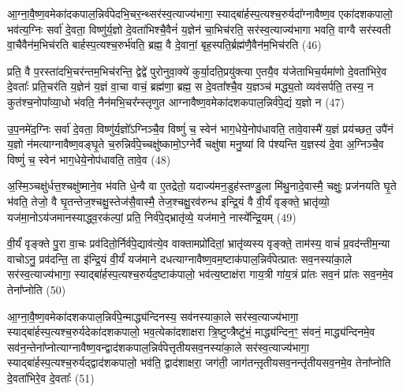 {\anuvakamend[{अपि॒ तꣴ स्यु॑र्वैन्ध भवति॒ चतु॑र्दश च॥७॥}]}

आ॒ग्ना॒वै॒ष्ण॒वमेका॑दकपाल॒न्निर्व॑पेदभि॒चर॒न्थ्सर॑स्व॒त्याज्य॑भागा॒ स्याद्बा॑र्\mbox{}हस्प॒त्यश्च॒रुर्यदा᳚ग्नावैष्ण॒व एका॑दशकपालो॒ भव॑त्य॒ग्निः सर्वा॑ दे॒वता॒ विष्णु॑र्य॒ज्ञो दे॒वता॑भिश्चै॒वैनं॑ य॒ज्ञेन॑ चा॒भिच॑रति॒ सर॑स्व॒त्याज्य॑भागा भवति॒ वाग्वै सर॑स्वती वा॒चैवैन॑म॒भिच॑रति बार्\mbox{}हस्प॒त्यश्च॒रुर्भ॑वति॒ ब्रह्म॒ वै दे॒वानां॒ बृह॒स्पति॒र्ब्रह्म॑णै॒वैन॑म॒भिच॑रति (46)

प्रति॒ वै प॒रस्ता॑दभि॒चर॑न्तम॒भिच॑रन्ति॒ द्वेद्वे॑ पुरोनुवा॒क्ये॑ कुर्या॒दति॒प्रयु॑क्त्या ए॒तयै॒व य॑जेताभिच॒र्यमा॑णो दे॒वता॑भिरे॒व दे॒वताः᳚ प्रति॒चर॑ति य॒ज्ञेन॑ य॒ज्ञं वा॒चा वाचं॒ ब्रह्म॑णा॒ ब्रह्म॒ स दे॒वता᳚श्चै॒व य॒ज्ञञ्च॑ मद्ध्य॒तो व्यव॑सर्पति॒ तस्य॒ न कुत॑श्च॒नोपा᳚व्या॒धो भ॑वति॒ नैन॑मभि॒चर᳚न्स्तृणुत आग्नावैष्ण॒वमेका॑दशकपाल॒न्निर्व॑पे॒द्यं य॒ज्ञो न (47)

उ॒प॒नमे॑द॒ग्निः सर्वा॑ दे॒वता॒ विष्णु॑र्य॒ज्ञो᳚\-ऽग्निञ्चै॒व विष्णुं॑ च॒ स्वेन॑ भाग॒धेये॒नोप॑धावति॒ तावे॒वास्मै॑ य॒ज्ञं प्रय॑च्छत॒ उपै॑नं य॒ज्ञो न॑मत्याग्नावैष्ण॒वङ्घृ॒ते च॒रुन्निर्व॑पे॒च्चक्षु॑ष्कामो॒\-ऽग्नेर्वै चक्षु॑षा मनु॒ष्या॑ वि प॑श्यन्ति य॒ज्ञस्य॑ दे॒वा अ॒ग्निञ्चै॒व विष्णुं॑ च॒ स्वेन॑ भाग॒धेये॒नोप॑धावति॒ तावे॒व (48)

अ॒स्मि॒ञ्चक्षु॑र्धत्त॒श्चक्षु॑ष्माने॒व भ॑वति धे॒न्वै वा ए॒तद्रेतो॒ यदाज्य॑मन॒डुह॑स्तण्डु॒ला मि॑थु॒नादे॒वास्मै॒ चक्षुः॒ प्रज॑नयति घृ॒ते भ॑वति॒ तेजो॒ वै घृ॒तन्तेज॒श्चक्षु॒स्तेज॑सै॒वास्मै॒ तेज॒श्चक्षु॒रव॑रुन्ध इन्द्रि॒यं वै वी॒र्यं॑ वृङ्क्ते॒ भ्रातृ॑व्यो॒ यज॑मा॒नो\-ऽय॑जमानस्याद्ध्व॒रक॑ल्पां॒ प्रति॒ निर्व॑पे॒द्भ्रातृ॑व्ये॒ यज॑माने॒ नास्ये᳚न्द्रि॒यम् (49)

वी॒र्यं॑ वृङ्क्ते पु॒रा वा॒चः प्रव॑दितो॒र्निर्व॑पे॒द्याव॑त्ये॒व वाक्तामप्रो॑दितां॒ भ्रातृ॑व्यस्य वृङ्क्ते॒ ताम॑स्य॒ वाचं॑ प्र॒वद॑न्तीम॒न्या वाचो\-ऽनु॒ प्रव॑दन्ति॒ ता इ॑न्द्रि॒यं वी॒र्यं॑ यज॑माने दधत्याग्नावैष्ण॒वम॒ष्टाक॑पाल॒न्निर्व॑पेत्प्रातः सव॒नस्या॑का॒ले सर॑स्व॒त्याज्य॑भागा॒ स्याद्बा॑र्\mbox{}हस्प॒त्यश्च॒रुर्यद॒ष्टाक॑पालो॒ भव॑त्य॒ष्टाक्ष॑रा गाय॒त्री गा॑य॒त्रं प्रा॑तः सव॒नं प्रा॑तः सव॒नमे॒व तेना᳚प्नोति (50)

आ॒ग्ना॒वै॒ष्ण॒वमेका॑दशकपाल॒न्निर्व॑पे॒न्माद्ध्य॑न्दिनस्य॒ सव॑नस्याका॒ले सर॑स्व॒त्याज्य॑भागा॒ स्याद्बा॑र्\mbox{}हस्प॒त्यश्च॒रुर्यदेका॑दशकपालो॒ भव॒त्येका॑दशाक्षरा त्रि॒ष्टुप्त्रैष्टु॑भं॒ माद्ध्य॑न्दिन॒ꣳ॒ स॑वनं॒ माद्ध्य॑न्दिनमे॒व सव॑न॒न्तेना᳚प्नोत्याग्नावैष्ण॒वन्द्वाद॑शकपाल॒न्निर्व॑पेत्तृतीयसव॒नस्या॑का॒ले सर॑स्व॒त्याज्य॑भागा॒ स्याद्बा॑र्\mbox{}हस्प॒त्यश्च॒रुर्यद्द्वाद॑शकपालो॒ भव॑ति॒ द्वाद॑शाक्षरा॒ जग॑ती॒ जाग॑तन्त़ृतीयसव॒नन्तृ॑तीयसव॒नमे॒व तेना᳚प्नोति दे॒वता॑भिरे॒व दे॒वताः᳚ (51)

